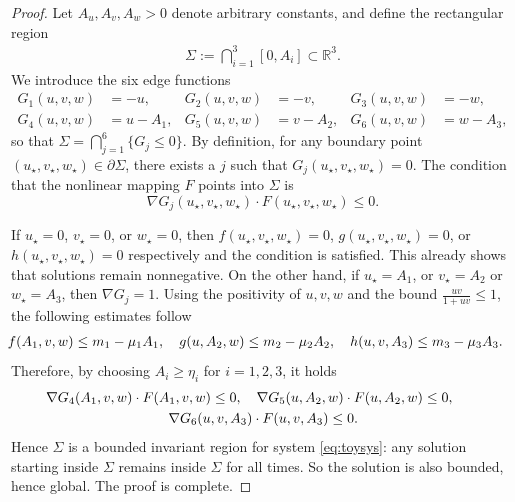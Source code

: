 \documentclass[12pt, a4paper]{amsart}
\numberwithin{equation}{section}
\newcommand{\RR}{\mathbb{R}}
\def\del{\partial}
\def\grad{\nabla}
\begin{document}
\begin{proof}
    Let $A_u, A_v, A_w > 0$ denote arbitrary constants, and define the rectangular region
    \begin{align*}
        \Sigma := \bigcap_{i=1}^3[0, A_i] \subset \RR^3.
    \end{align*}
    We introduce the six edge functions
    \begin{align*}
        G_1(u, v, w) &= -u, & G_2(u, v, w)&= -v, & G_3(u, v, w) &= -w, \\[0.7em]
        G_4(u, v, w) &= u - A_1, & G_5(u, v, w)&= v - A_2, & G_6(u, v, w) &= w - A_3,
    \end{align*}
    so that $\Sigma = \bigcap_{j=1}^6\{ G_j \le 0\}$.
    By definition, for any boundary point $(u_\star, v_\star, w_\star) \in \del\Sigma$, there exists a $j$ such that $G_{j}(u_\star,v_\star,w_\star) = 0$.
    The condition that the nonlinear mapping $F$ points into $\Sigma$ is 
    $$\grad G_{j}(u_\star, v_\star, w_\star) \cdot F(u_\star, v_\star, w_\star) \le 0.$$
    
    If $u_\star = 0$, $v_\star = 0$, or $w_\star = 0$, then $f(u_\star, v_\star, w_\star) = 0$, $g(u_\star, v_\star, w_\star) = 0$, or $h(u_\star, v_\star, w_\star) = 0$ respectively and the condition is satisfied. This already shows that solutions remain nonnegative. On the other hand, if $u_\star = A_1$, or $v_\star = A_2$ or $w_\star = A_3$, then $\grad G_{j} = 1$.
    Using the positivity of $u,v,w$ and the bound $\frac{uv}{1+uv} \le 1$, the following estimates follow
    \begin{align*}
    \hspace{-1em} f(A_1, v, w) \le m_1 - \mu_1 A_1, \quad 
    g(u, A_2, w) \le m_2 - \mu_2 A_2, \quad 
    h(u, v, A_3) \le m_3 - \mu_3 A_3.
    \end{align*}
    Therefore, by choosing $A_i \ge \eta_i$ for $i = 1, 2, 3$, it holds
    \begin{gather*}
    \hspace{-2em}\grad G_{4}(A_1, v, w) \cdot F(A_1, v, w) \le 0, \quad \grad G_{5}(u, A_2, w) \cdot F(u, A_2, w) \le 0,\\ \grad G_{6}(u, v, A_3) \cdot F(u, v, A_3) \le 0.
    \end{gather*}
    Hence $\Sigma$ is a bounded invariant region for system \eqref{eq:toysys}:
    any solution starting inside $\Sigma$ remains inside $\Sigma$ for all times. So the solution is also bounded, hence global. The proof is complete.
\end{proof}



\end{document}
